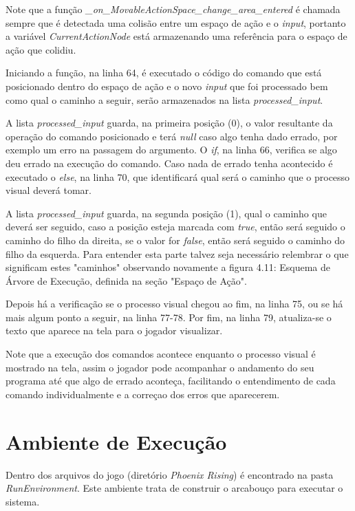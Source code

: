 Note que a função \textit{\_on\_MovableActionSpace\_change\_area\_entered} é 
chamada sempre que é detectada uma colisão entre um espaço de ação e o 
\textit{input}, portanto a variável \textit{CurrentActionNode} está armazenando
uma referência para o espaço de ação que colidiu.

Iniciando a função, na linha 64,
é executado o código do comando que está posicionado dentro do espaço de ação
e o novo \textit{input} que foi processado bem como qual o caminho a seguir,
serão armazenados na lista \textit{processed\_input}.

A lista \textit{processed\_input} guarda, na primeira posição (0), o valor 
resultante da operação do comando posicionado e terá \textit{null} caso algo
tenha dado errado, por exemplo um erro na passagem do argumento. O \textit{if},
na linha 66, verifica se algo deu errado na execução do comando. Caso nada
de errado tenha acontecido é executado o \textit{else}, na linha 70, que
identificará qual será o caminho que o processo visual deverá tomar.

A lista \textit{processed\_input} guarda, na segunda posição (1), qual o
caminho que deverá ser seguido, caso a posição esteja marcada com \textit{true},
então será seguido o caminho do filho da direita, se o valor for \textit{false},
então será seguido o caminho do filho da esquerda. Para entender esta parte
talvez seja necessário relembrar o que significam estes "caminhos" observando 
novamente a figura 4.11: Esquema de Árvore de Execução, definida na seção 
"Espaço de Ação".

Depois há a verificação se o processo visual chegou ao fim, na linha 75, ou 
se há mais algum ponto a seguir, na linha 77-78. Por fim, na linha 79,
atualiza-se o texto que aparece na tela para o jogador visualizar.

Note que a execução dos comandos acontece enquanto o processo visual é mostrado
na tela, assim o jogador pode acompanhar o andamento do seu programa até que
algo de errado aconteça, facilitando o entendimento de cada comando 
individualmente e a correçao dos erros que aparecerem.

\section{Ambiente de Execução}

Dentro dos arquivos do jogo (diretório \textit{Phoenix Rising}) é encontrado na
pasta \textit{RunEnvironment}. Este ambiente trata de construir o arcabouço 
para executar o sistema.

